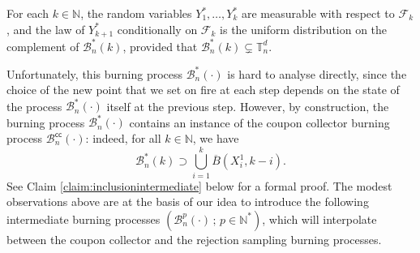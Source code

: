 \documentclass[a4paper,11pt]{article}
\begin{document}
\begin{claim}\label{claim:rejectionsampling}
For each $k\in\mathbb{N}$, the random variables $Y_1^*,\ldots,Y_k^*$ are measurable with respect to $\mathcal{F}_k$, and the law of $Y_{k+1}^*$ conditionally on $\mathcal{F}_k$ is the uniform distribution on the complement of $\mathcal{B}_n^*(k)$, provided that ${\mathcal{B}_n^*(k)\varsubsetneq\mathbb{T}_n^d}$.
\end{claim}

Unfortunately, this burning process $\mathcal{B}_n^*(\cdot)$ is hard to analyse directly, since the choice of the new point that we set on fire at each step depends on the state of the process $\mathcal{B}_n^*(\cdot)$ itself at the previous step.
However, by construction, the burning process $\mathcal{B}_n^*(\cdot)$ contains an instance of the coupon collector burning process $\mathcal{B}_n^\mathsf{cc}(\cdot)$: indeed, for all $k\in\mathbb{N}$, we have
\[\mathcal{B}_n^*(k)\supset\bigcup_{i=1}^k\overline{B}\left(X_i^1,k-i\right).\]
See Claim \ref{claim:inclusionintermediate} below for a formal proof.
The modest observations above are at the basis of our idea to introduce the following intermediate burning processes $\left(\mathcal{B}_n^p(\cdot)\,;\,p\in\mathbb{N}^*\right)$, which will interpolate between the coupon collector and the rejection sampling burning processes.
\end{document}
